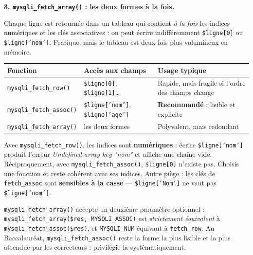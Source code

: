 \documentclass[11pt]{article}
\begin{document}
\textbf{3. \texttt{mysqli\_fetch\_array()} : les deux formes à la fois.}\par
Chaque ligne est retournée dans un tableau qui contient \emph{à la fois} les indices numériques et les clés associatives : on peut écrire indifféremment \texttt{\$ligne[0]} ou \texttt{\$ligne['nom']}. Pratique, mais le tableau est deux fois plus volumineux en mémoire.

\begin{center}
\begin{tabularx}{\linewidth}{|l|X|X|}
\hline
\rowcolor{popblueL}
\textbf{Fonction} & \textbf{Accès aux champs} & \textbf{Usage typique} \\
\hline
\texttt{mysqli\_fetch\_row()} & \texttt{\$ligne[0]}, \texttt{\$ligne[1]}\ldots & Rapide, mais fragile si l'ordre des champs change \\
\hline
\texttt{mysqli\_fetch\_assoc()} & \texttt{\$ligne['nom']}, \texttt{\$ligne['age']} & \textbf{Recommandé} : lisible et explicite \\
\hline
\texttt{mysqli\_fetch\_array()} & les deux formes & Polyvalent, mais redondant \\
\hline
\end{tabularx}
\end{center}

\begin{attention}
Avec \texttt{mysqli\_fetch\_row()}, les indices sont \textbf{numériques} : écrire \texttt{\$ligne['nom']} produit l'erreur \emph{Undefined array key "nom"} et affiche une chaîne vide. Réciproquement, avec \texttt{mysqli\_fetch\_assoc()}, \texttt{\$ligne[0]} n'existe pas. Choisis une fonction et reste cohérent avec ses indices. Autre piège : les clés de \texttt{fetch\_assoc} sont \textbf{sensibles à la casse} — \texttt{\$ligne['Nom']} ne vaut pas \texttt{\$ligne['nom']}.
\end{attention}

\begin{savaistu}
\texttt{mysqli\_fetch\_array()} accepte un deuxième paramètre optionnel : \texttt{mysqli\_fetch\_array(\$res, MYSQLI\_ASSOC)} est \emph{strictement équivalent} à \texttt{mysqli\_fetch\_assoc(\$res)}, et \texttt{MYSQLI\_NUM} équivaut à \texttt{fetch\_row}. Au Baccalauréat, \texttt{mysqli\_fetch\_assoc()} reste la forme la plus lisible et la plus attendue par les correcteurs : privilégie-la systématiquement.
\end{savaistu}
\end{document}
